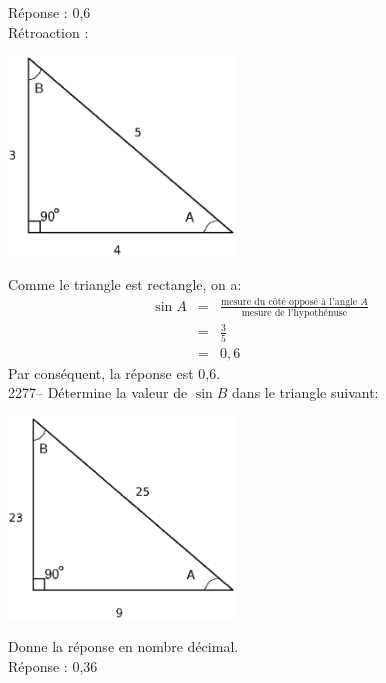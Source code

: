 \documentclass[letterpaper, 12pt]{article}
\begin{document}
R\'eponse : 0,6\\

R\'etroaction :\\
\begin{center}
 \includegraphics[width=6cm,bb=14 14 445 371]{Triangle_rectangle2276.eps}
\end{center}
Comme le triangle est rectangle, on a:
\begin{eqnarray*}
 \sin{A}&=&\frac{\textrm{mesure du c\^ot\'e oppos\'e \`a l'angle $A$}}{\textrm{mesure de l'hypoth\'enuse}}\\
&=&\frac{3}{5}\\[2mm]
&=&0,6
\end{eqnarray*}
Par cons\'equent, la r\'eponse est 0,6.\\

2277-- D\'etermine la valeur de $\sin{B}$ dans le triangle suivant:
\begin{center}
 \includegraphics[width=6cm,bb=14 14 434 387]{Triangle_rectangle2277.eps}
\end{center}
Donne la r\'eponse en nombre d\'ecimal.\\

R\'eponse : 0,36\\
\end{document}
